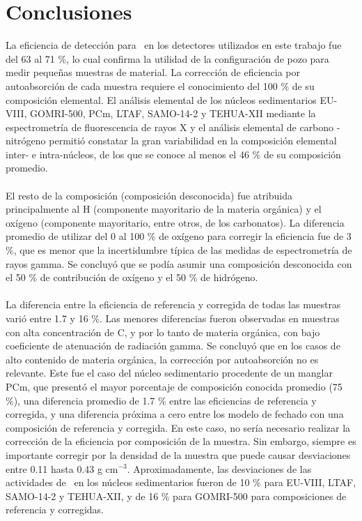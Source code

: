 \chapter{Conclusiones}
\lettrine{L}{}a eficiencia de detección para \PbCero\, en los detectores utilizados en este trabajo fue del 63 al 71 \%, lo cual confirma la utilidad de la configuración de pozo para medir pequeñas muestras de material. La corrección de eficiencia por autoabsorción de cada muestra requiere el conocimiento del 100 \% de su composición elemental. El análisis elemental de los núcleos sedimentarios EU-VIII, GOMRI-500, PCm, LTAF, SAMO-14-2 y TEHUA-XII mediante la espectrometría de fluorescencia de rayos X y el análisis elemental de carbono - nitrógeno permitió constatar la gran variabilidad en la composición elemental inter- e intra-núcleos, de los que se conoce al menos el 46 \% de su composición promedio.  
\\
\\
El resto de la composición (composición desconocida) fue atribuida principalmente al H (componente mayoritario de la materia orgánica) y el oxígeno (componente mayoritario, entre otros, de los carbonatos). La diferencia promedio de utilizar del 0 al 100 \% de oxígeno para corregir la eficiencia fue de 3 \%, que es menor que la incertidumbre típica de las medidas de espectrometría de rayos gamma. Se concluyó que se podía asumir una composición desconocida con el 50 \% de contribución de oxígeno y el 50 \% de hidrógeno. 
\\
\\
La diferencia entre la eficiencia de referencia y corregida de todas las muestras varió entre 1.7 y 16 \%. Las menores diferencias fueron observadas en muestras con alta concentración de C, y por lo tanto de materia orgánica, con bajo coeficiente de atenuación de radiación gamma. Se concluyó que en los casos de alto contenido de materia orgánica, la corrección por autoabsorción no es relevante. Este fue el caso del núcleo sedimentario procedente de un manglar PCm, que presentó el mayor porcentaje de composición conocida promedio (75 \%), una diferencia promedio de 1.7 \% entre las eficiencias de referencia y corregida, y una diferencia próxima a cero entre los modelo de fechado con una composición de referencia y corregida. En este caso, no sería necesario realizar la corrección de la eficiencia por composición de la muestra. Sin embargo, siempre es importante corregir por la densidad de la muestra que puede causar desviaciones entre 0.11 hasta 0.43 g cm$^{-3}$. Aproximadamente, las desviaciones de las actividades de \PbCero\, en los núcleos sedimentarios fueron de 10 \% para EU-VIII, LTAF, SAMO-14-2 y TEHUA-XII, y de 16 \% para GOMRI-500 para composiciones de referencia y corregidas. 
